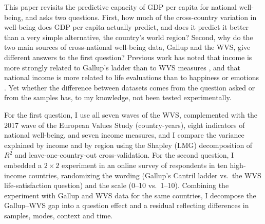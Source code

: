 \documentclass[12pt]{article}
\begin{document}
This paper revisits the predictive capacity of GDP per capita for national well-being, and asks two questions. First, how much of the cross-country variation in well-being does GDP per capita actually predict, and does it predict it better than a very simple alternative, the country's world region? Second, why do the two main sources of cross-national well-being data, Gallup and the WVS, give different answers to the first question? Previous work has noted that income is more strongly related to Gallup's ladder than to WVS measures \citep{deaton_income_2008}, and that national income is more related to life evaluations than to happiness or emotions \citep{inglehart_development_2008,kahneman_high_2010}. Yet whether the difference between datasets comes from the question asked or from the samples has, to my knowledge, not been tested experimentally.

For the first question, I use all seven waves of the WVS, complemented with the 2017 wave of the European Values Study (\nWVSCountryYears country-years), eight indicators of national well-being, and seven income measures, and I compare the variance explained by income and by region using the Shapley (LMG) decomposition of $R^2$ \citep{lindeman_introduction_1980,gromping_estimators_2007} and leave-one-country-out cross-validation. For the second question, I embedded a $2 \times 2$ experiment in an online survey of \nFabre respondents in ten high-income countries, randomizing the wording (Gallup's Cantril ladder vs.\ the WVS life-satisfaction question) and the scale (0--10 vs.\ 1--10). Combining the experiment with Gallup and WVS data for the same countries, I decompose the Gallup--WVS gap into a question effect and a residual reflecting differences in samples, modes, context and time.
\end{document}
